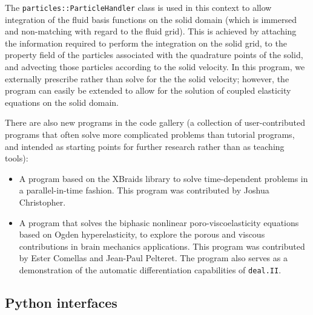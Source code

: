 \documentclass{ansarticle-preprint}
\newcommand{\specialword}[1]{\texttt{#1}}
\newcommand{\dealii}{{\specialword{deal.II}}\xspace}
\begin{document}
\begin{itemize}
        The \texttt{particles::ParticleHandler} class is used in this context
        to allow integration of the fluid basis functions on the solid domain
        (which is immersed and non-matching with regard to the fluid grid). This is
        achieved by attaching the information required to perform the
        integration on the solid grid, to the property field of the particles
        associated with the quadrature points of the solid, and advecting those
        particles according to the solid velocity. In this program, we
        externally prescribe rather than solve for the
        the solid velocity; however,
        the program can easily be extended to allow for the solution of
        coupled elasticity equations on the solid domain.
\end{itemize}

There are also new programs in the code gallery (a collection of
user-contributed programs that often solve more complicated problems
than tutorial programs, and intended as starting points for further
research rather than as teaching tools):
\begin{itemize}
  \item A program based on the XBraids library to solve time-dependent
    problems in a parallel-in-time fashion. This program was
    contributed by Joshua Christopher.
  \item A program that solves the biphasic nonlinear
    poro-viscoelasticity equations based on Ogden hyperelasticity, to
    explore the porous and viscous contributions in brain mechanics
    applications.  This program was contributed by Ester Comellas and
    Jean-Paul Pelteret. The program also serves as a demonstration of
    the automatic differentiation capabilities of \dealii{}.
\end{itemize}

\subsection{Python interfaces}
\label{subsec:python}
\end{document}
